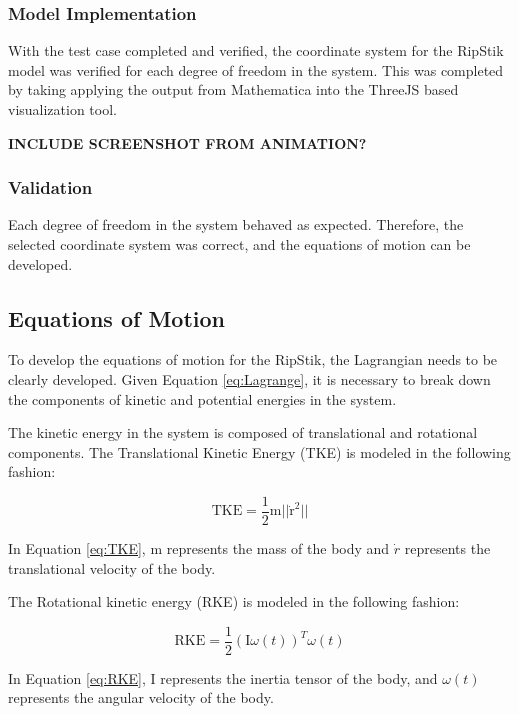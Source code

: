 \subsubsection{Model Implementation}

With the test case completed and verified, the coordinate system for the RipStik model was verified for each degree of freedom in the system. 
This was completed by taking applying the output from Mathematica into the ThreeJS based visualization tool.

\textbf{INCLUDE SCREENSHOT FROM ANIMATION?}
\subsubsection{Validation}

Each degree of freedom in the system behaved as expected. 
Therefore, the selected coordinate system was correct, and the equations of motion can be developed.

\subsection{Equations of Motion}

To develop the equations of motion for the RipStik, the Lagrangian needs to be clearly developed. Given Equation \ref{eq:Lagrange}, it is necessary to break down the components of kinetic and potential energies in the system.

The kinetic energy in the system is composed of translational and rotational components.
The Translational Kinetic Energy (TKE) is modeled in the following fashion:

\begin{equation}
\label{eq:TKE}
\text{TKE} = \frac{1}{2}{\text{m}}{\lvert \lvert {\dot{\text{r}}^2} \rvert \rvert}
\end{equation}

In Equation \ref{eq:TKE}, m represents the mass of the body and $\dot{r}$ represents the translational velocity of the body.
\par
The Rotational kinetic energy (RKE) is modeled in the following fashion:

\begin{equation}
\label{eq:RKE}
\text{RKE} = \frac{1}{2}({\text{I}}{\omega(t)})^T\omega(t)
\end{equation}

In Equation \ref{eq:RKE}, I represents the inertia tensor of the body, and $\omega(t)$ represents the angular velocity of the body.

